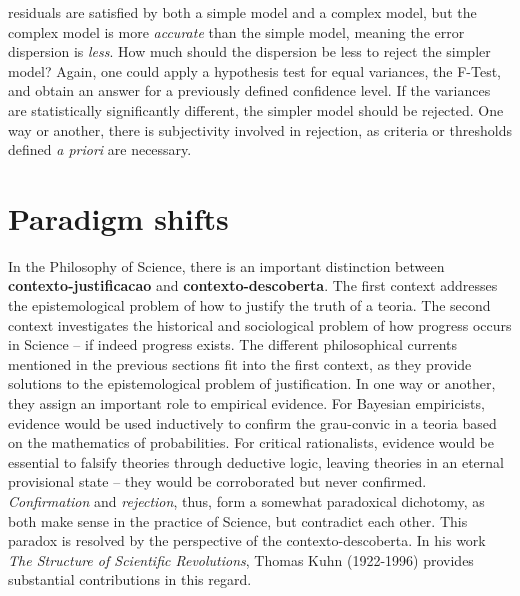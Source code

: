 \documentclass[./main_en.tex]{subfiles}
\begin{document}
residuals are satisfied by both a simple \gls{model} and a complex \gls{model}, but the complex \gls{model} is more \textit{accurate} than the simple \gls{model}, meaning the error dispersion is \textit{less}. How much should the dispersion be less to reject the simpler \gls{model}? Again, one could apply a hypothesis test for equal variances, the F-Test, and obtain an answer for a previously defined confidence level. If the variances are statistically significantly different, the simpler \gls{model} should be rejected. One way or another, there is subjectivity involved in rejection, as criteria or thresholds defined \textit{a priori} are necessary.

\section{Paradigm shifts} \label{sec:epis:kuhn}

\par In the Philosophy of Science, there is an important distinction between \textbf{\gls{contexto-justificacao}} and \textbf{\gls{contexto-descoberta}}. The first context addresses the epistemological problem of how to justify the truth of a \gls{teoria}. The second context investigates the historical and sociological problem of how progress occurs in Science – if indeed progress exists. The different philosophical currents mentioned in the previous sections fit into the first context, as they provide solutions to the epistemological problem of justification. In one way or another, they assign an important role to empirical evidence. For Bayesian empiricists, evidence would be used inductively to confirm the \gls{grau-convic} in a \gls{teoria} based on the mathematics of probabilities. For critical rationalists, evidence would be essential to falsify theories through deductive logic, leaving theories in an eternal provisional state – they would be corroborated but never confirmed. \textit{Confirmation} and \textit{rejection}, thus, form a somewhat paradoxical dichotomy, as both make sense in the practice of Science, but contradict each other. This paradox is resolved by the perspective of the \gls{contexto-descoberta}. In his work \textit{The Structure of Scientific Revolutions}, Thomas Kuhn (1922-1996) provides substantial contributions in this regard.
\end{document}
